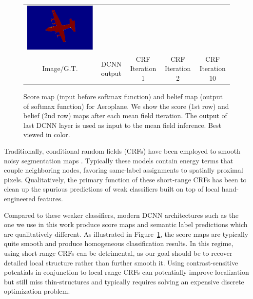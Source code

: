 \begin{figure}[ht]
\begin{tabular}{c c c c c}
    \includegraphics[width=0.16\linewidth]{fig/mean_field_illustration/Belief_Class1_Itr10.pdf} \\
    Image/G.T. & DCNN output & CRF Iteration 1 & CRF Iteration 2 & CRF Iteration 10 \\
  \end{tabular}
  \caption{Score map (input before softmax function) and belief map (output of softmax function) for Aeroplane. We show the score (1st row) and belief (2nd row) maps after each mean field iteration. The output of last DCNN layer is used as input to the mean field inference. Best viewed in color.}
  \label{fig:score-maps}
\end{figure}

Traditionally, conditional random fields (CRFs) have been employed to smooth
noisy segmentation maps \cite{rother2004grabcut, kohli2009robust}. Typically
these models contain energy terms that couple neighboring nodes, favoring
same-label assignments to spatially proximal pixels. Qualitatively, the
primary function of these short-range CRFs has been to clean up the spurious
predictions of weak classifiers built on top of local hand-engineered features.

Compared to these weaker classifiers, modern DCNN architectures such as
the one we use in this work produce score maps and semantic label
predictions which are qualitatively different. As illustrated in
Figure~\ref{fig:score-maps}, the score maps are typically quite smooth and
produce homogeneous classification results. In this regime, using short-range
CRFs can be detrimental, as our goal should be to recover detailed local
structure rather than further smooth it. Using contrast-sensitive potentials
\cite{rother2004grabcut} in conjunction to local-range CRFs can potentially
improve localization but still miss thin-structures and typically requires
solving an expensive discrete optimization problem.

